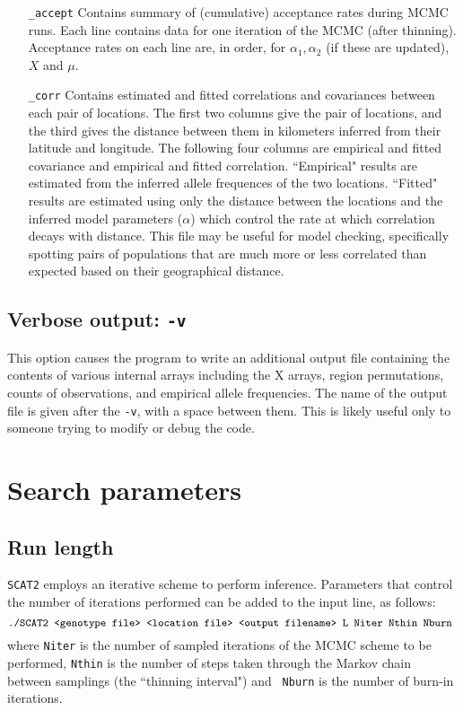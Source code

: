 \documentclass[10pt,titlepage,times,letterpaper]{article}
\def\SCAT{{\tt SCAT2} }
\begin{document}
\begin{enumerate}[\_params]
\item[{\tt \_accept}] Contains summary of (cumulative) acceptance rates
during MCMC runs. Each line contains data for one iteration of the
MCMC (after thinning). Acceptance rates on each line are, in order,
for $\alpha_1,\alpha_2$ (if these are updated), $X$ and $\mu$.
\item[{\tt \_corr}] Contains estimated and fitted correlations
and covariances between each pair of locations.  The first two columns
give the pair of locations, and the third gives the distance between them
in kilometers inferred from their latitude and longitude.  The following
four columns are empirical and fitted covariance and empirical and
fitted correlation.  ``Empirical" results are estimated from the inferred
allele frequences of the two locations.  ``Fitted" results are estimated
using only the distance between the locations and the inferred model
parameters ($\alpha$) which control the rate at which correlation decays
with distance.  This file may be useful for model checking, specifically
spotting pairs of populations that are much more or less correlated than
expected based on their geographical distance.
\end{enumerate}

\subsection{Verbose output: {\tt -v}}

This option causes the program to write an additional output file
containing the contents of various internal arrays including the
X arrays, region permutations, counts of observations, 
and empirical allele frequencies.  The name of the output file
is given after the {\tt -v}, with a space between them.  This is likely 
useful only to someone trying to modify or debug the code.


\section{Search parameters} \label{HowLong}

\subsection{Run length}
\SCAT employs an iterative scheme to perform inference. 
Parameters that control the number of iterations performed
can be added to the input line, as follows:
$$\text{{\small \tt ./SCAT2 <genotype file> <location file> <output
filename> L Niter Nthin Nburn }}$$ where {\tt Niter} is the number
of sampled iterations of the MCMC scheme to be performed, {\tt Nthin} is the
number of steps taken through the Markov chain between samplings (the ``thinning interval") and {\tt
Nburn} is the number of burn-in iterations.
\end{document}
